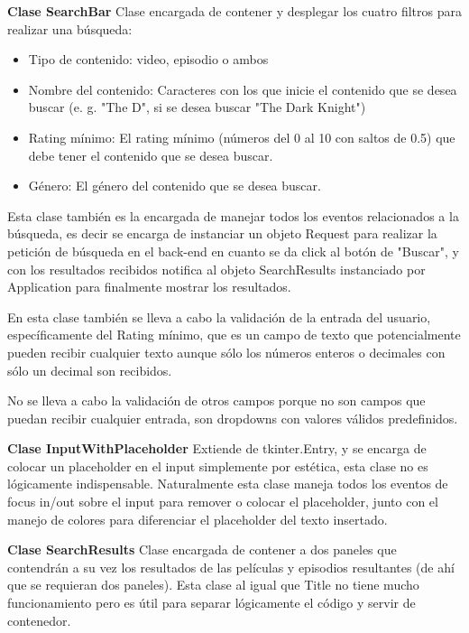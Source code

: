 \textbf{Clase SearchBar}\newline
Clase encargada de contener y desplegar los cuatro filtros para realizar una búsqueda:
\begin{itemize}
	\item Tipo de contenido: video, episodio o ambos
	\item Nombre del contenido: Caracteres con los que inicie el contenido que se desea buscar (e. g. "The D", si se desea buscar "The Dark Knight")
	\item Rating mínimo: El rating mínimo (números del 0 al 10 con saltos de 0.5) que debe tener el contenido que se desea buscar.
	\item Género: El género del contenido que se desea buscar.
\end{itemize}

Esta clase también es la encargada de manejar todos los eventos relacionados a la búsqueda, es decir se encarga de instanciar un objeto Request para realizar la petición de búsqueda en el back-end en cuanto se da click al botón de "Buscar", y con los resultados recibidos notifica al objeto SearchResults instanciado por Application para finalmente mostrar los resultados.

En esta clase también se lleva a cabo la validación de la entrada del usuario, específicamente del Rating mínimo, que es un campo de texto que potencialmente pueden recibir cualquier texto aunque sólo los números enteros o decimales con sólo un decimal son recibidos.

No se lleva a cabo la validación de otros campos porque no son campos que puedan recibir cualquier entrada, son dropdowns con valores válidos predefinidos.

\textbf{Clase InputWithPlaceholder}\newline
Extiende de tkinter.Entry, y se encarga de colocar un placeholder en el input simplemente por estética, esta clase no es lógicamente indispensable. Naturalmente esta clase maneja todos los eventos de focus in/out sobre el input para remover o colocar el placeholder, junto con el manejo de colores para diferenciar el placeholder del texto insertado.

\textbf{Clase SearchResults}\newline
Clase encargada de contener a dos paneles que contendrán a su vez los resultados de las películas y episodios resultantes (de ahí que se requieran dos paneles). Esta clase al igual que Title no tiene mucho funcionamiento pero es útil para separar lógicamente el código y servir de contenedor.

